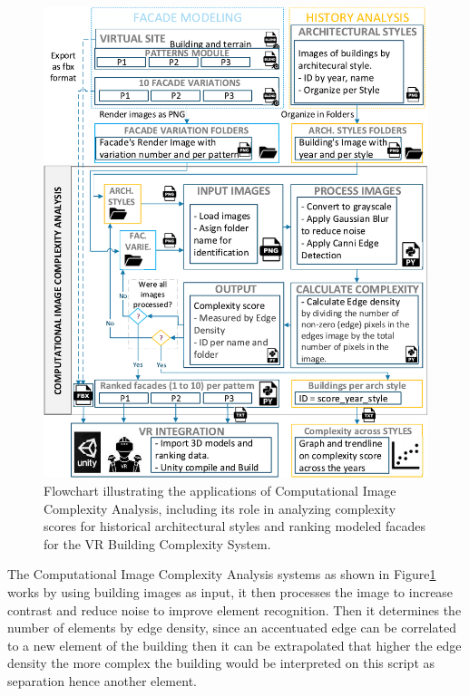     \begin{figure}[!htb]
      \centering
      \includegraphics[width= \linewidth, trim=0 0 0 0, clip]{Images/ImageComplexityAnalysisFlowchart}
      \caption{Flowchart illustrating the applications of Computational Image Complexity Analysis, including its role in analyzing complexity scores for historical architectural styles and ranking modeled facades for the VR Building Complexity System.}
      \label{fig:ImageComplexityAnalysisFlowchart}
    \end{figure}

The Computational Image Complexity Analysis systems as shown in Figure\ref{fig:ImageComplexityAnalysisFlowchart} works by using building images as input, it then processes the image to increase contrast and reduce noise to improve element recognition.
Then it determines the number of elements by edge density, since an accentuated edge can be correlated to a new element of the building then it can be extrapolated that higher the edge density the more complex the building would be interpreted on this script as separation hence another element.

